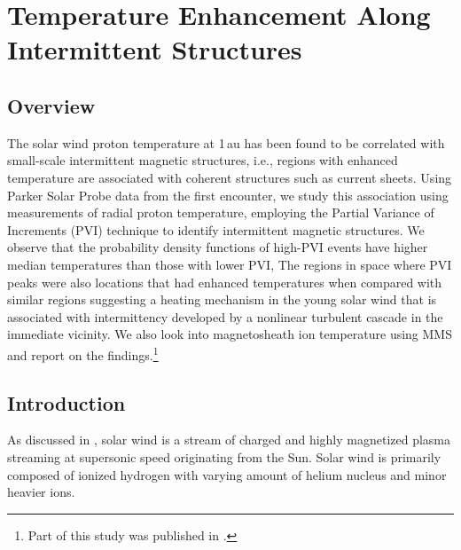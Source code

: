 %
%
\chapter{Temperature Enhancement Along Intermittent Structures}\label{chap:chap6}

    \section{Overview} \label{sec:ovrvw6}

        The solar wind proton temperature at 1\,au has been found to be correlated with small-scale
        intermittent magnetic structures, i.e., regions with enhanced temperature are associated
        with coherent structures such as current sheets. Using Parker Solar Probe data from the
        first encounter, we study this association using measurements of radial proton temperature,
        employing the Partial Variance of Increments (PVI) technique to identify intermittent
        magnetic structures. We observe that the probability density functions of high-PVI events
        have higher median temperatures than those with lower PVI, The regions in space where PVI
        peaks were also locations that had enhanced temperatures when compared with similar regions
        suggesting a heating mechanism in the young solar wind that is associated with intermittency
        developed by a nonlinear turbulent cascade in the immediate vicinity. We also look into
        magnetosheath ion temperature using MMS and report on the findings.\footnote{Part of this
        study was published in \citet{Qudsi2020}.}

    \section{Introduction} \label{sec:intr6}

        As discussed in , solar wind is a stream of charged and highly magnetized
        plasma streaming at supersonic speed originating from the Sun. Solar wind is primarily
        composed of ionized hydrogen \citep{Marsch1982a, Kasper2012} with varying amount of helium
        nucleus \citep{Maruc2012} and minor heavier ions.

